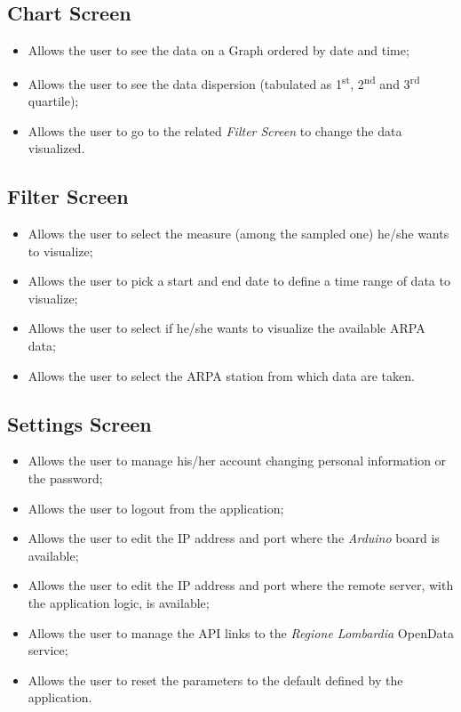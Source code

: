 \subsection{Chart Screen}
\begin{itemize}
    \item Allows the user to see the data on a Graph ordered by date and time;
    \item Allows the user to see the data dispersion (tabulated as 1\textsuperscript{st}, 2\textsuperscript{nd} and 3\textsuperscript{rd} quartile);
    \item Allows the user to go to the related \textit{Filter Screen} to change the data visualized.
\end{itemize}
    
\subsection{Filter Screen}
\begin{itemize}
    \item Allows the user to select the measure (among the sampled one) he/she wants to visualize;
    \item Allows the user to pick a start and end date to define a time range of data to visualize;
    \item Allows the user to select if he/she wants to visualize the available ARPA data;
    \item Allows the user to select the ARPA station from which data are taken.
\end{itemize}
    
\subsection{Settings Screen}
\begin{itemize}
    \item Allows the user to manage his/her account changing personal information or the password;
    \item Allows the user to logout from the application;
    \item Allows the user to edit the IP address and port where the \textit{Arduino} board is available;
    \item Allows the user to edit the IP address and port where the remote server, with the application logic, is available;
    \item Allows the user to manage the API links to the \textit{Regione Lombardia} OpenData service;
    \item Allows the user to reset the parameters to the default defined by the application.
\end{itemize}

